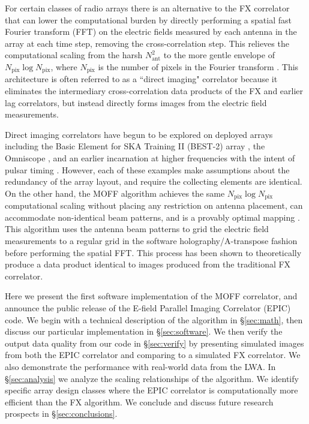 \documentclass[a4paper,fleqn,usenatbib]{../mnras}
\newcommand{\Nant}{N_{\text{ant}}}
\newcommand{\Npix}{N_{\text{pix}}}
\begin{document}
For certain classes of radio arrays there is an alternative to the FX correlator that can lower the computational burden by directly performing a spatial fast Fourier transform (FFT) on the electric fields measured by each antenna in the array at each time step, removing the cross-correlation step. This relieves the computational scaling from the harsh $\Nant^2$ to the more gentle envelope of $\Npix\log\Npix$, where $\Npix$ is the number of pixels in the Fourier transform \citep[e.g.][]{mor11,teg09,teg10}. This architecture is often referred to as a ``direct imaging" correlator because it eliminates the intermediary cross-correlation data products of the FX and earlier lag correlators, but instead directly forms images from the electric field measurements.

Direct imaging correlators have begun to be explored on deployed arrays including the Basic Element for SKA Training II (BEST-2) array \citep{fos14}, the Omniscope \citep{zhe14}, and an earlier incarnation at higher frequencies with the intent of pulsar timing \citep{oto94, dai00}. However, each of these examples make assumptions about the redundancy of the array layout, and require the collecting elements are identical. On the other hand, the MOFF algorithm achieves the same $\Npix \log \Npix$ computational scaling without placing any restriction on antenna placement, can accommodate non-identical beam patterns, and is a provably optimal mapping \citep{mor11}. This algorithm uses the antenna beam patterns to grid the electric field measurements to a regular grid in the software holography/A-transpose fashion \citep{mor09,bha08,teg97b} before performing the spatial FFT. This process has been shown to theoretically produce a data product identical to images produced from the traditional FX correlator.

Here we present the first software implementation of the MOFF correlator, and announce the public release of the E-field Parallel Imaging Correlator (EPIC) code. We begin with a technical description of the algorithm in \S \ref{sec:math}, then discuss our particular implementation in \S \ref{sec:software}. We then verify the output data quality from our code in \S \ref{sec:verify} by presenting simulated images from both the EPIC correlator and comparing to a simulated FX correlator. We also demonstrate the performance with real-world data from the LWA. In \S \ref{sec:analysis} we analyze the scaling relationships of the algorithm. We identify specific array design classes where the EPIC correlator is computationally more efficient than the FX algorithm. We conclude and discuss future research prospects in \S\ref{sec:conclusions}.
\end{document}
